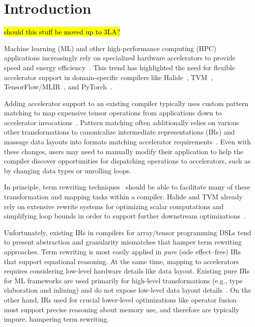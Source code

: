 \section{Introduction}

\hl{should this stuff be moved up to 3LA?}

Machine learning (ML) and other
  high-performance computing (HPC)
  applications increasingly rely on
  specialized hardware accelerators to
  provide speed and energy efficiency~\cite{jouppi2017tpu, krizhevsky2012conv, reuther2019survey}.
This trend has highlighted the need
  for flexible accelerator support
  in domain-specific compilers like
  Halide~\cite{halide},
  TVM~\cite{tvm},
  TensorFlow/MLIR~\cite{tensorflow, mlir}, and
  PyTorch~\cite{pytorch}.

Adding accelerator support to
  an existing compiler typically
  uses custom pattern matching to
  map expensive tensor operations
  from applications down to
  accelerator invocations~\cite{
    yang2020interstellar, byoc}.
Pattern matching often additionally relies on
  various other transformations
  to canonicalize intermediate representations (IRs)
  and massage data layouts into
  formats matching accelerator requirements~\cite{nvidia2020nhwc}.
Even with these changes,
  users may need to manually modify their application to
  help the compiler discover opportunities
  for dispatching operations to accelerators, 
  such as by changing data types or unrolling loops.
    
In principle, term rewriting techniques~\cite{baader1998term}
  should be able to facilitate many of
  these transformation and mapping tasks
  within a compiler.
Halide and TVM already rely
  on extensive rewrite systems for
  optimizing scalar computations and
  simplifying loop bounds in order to
  support further downstream optimizations~\cite{newcomb2020halide-rewrite,
  hagedorn2020func-high-perf}.

Unfortunately, existing IRs in compilers for
  array/tensor programming DSLs tend to
  present abstraction and granularity mismatches
  that hamper term rewriting approaches.
Term rewriting is most easily applied in
  \textit{pure} (side effect--free) IRs
  that support equational reasoning.
At the same time,
  mapping to accelerators requires considering
  low-level hardware details like data layout.
Existing pure IRs for ML frameworks are used
  primarily for high-level transformations
  (e.g., type elaboration and inlining)
  and do not expose low-level data layout details~\cite{relay}.
On the other hand,
  IRs used for crucial lower-level optimizations like
  operator fusion must support
  precise reasoning about memory use,
  and therefore are typically impure,
  hampering term rewriting.%


